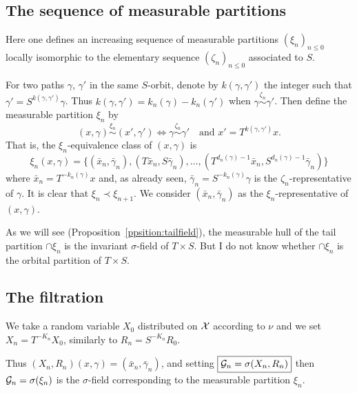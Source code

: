\documentclass[12pt,a4paper]{article}
\begin{document}
\subsection{The sequence of measurable partitions}

Here one defines an increasing sequence of measurable partitions ${(\xi_n)}_{n \leq 0}$ 
locally isomorphic to the elementary sequence ${(\zeta_n)}_{n \leq 0}$ associated to $S$. 

For two paths $\gamma$, $\gamma'$ in the same $S$-orbit, denote by $k(\gamma,\gamma')$ 
the integer such that $\gamma'=S^{k(\gamma,\gamma')}\gamma$. 
Thus $k(\gamma,\gamma') = k_n(\gamma)-k_n(\gamma')$ when $\gamma \overset{\zeta_n}{\sim} \gamma'$. 
Then define the measurable partition $\xi_n$ by 
$$
\boxed{(x, \gamma) \overset{\xi_n}{\sim} (x', \gamma') \iff 
\gamma \overset{\zeta_n}{\sim} \gamma' \quad 
\text{and $x'=T^{k(\gamma,\gamma')}x$}}. 
$$
That is, the $\xi_n$-equivalence class of $(x,\gamma)$ is 
$$
\boxed{\xi_n(x,\gamma) = \bigl\{(\bar x_n, \bar\gamma_n), (T\bar x_n, S\bar\gamma_n), 
\ldots, (T^{d_n(\gamma)-1}\bar x_n, S^{d_n(\gamma)-1}\bar\gamma_n) \bigr\}}
$$
where $\bar x_n = T^{-k_n(\gamma)}x$ and, as already seen, 
$\bar\gamma_n = S^{-k_n(\gamma)}\gamma$ is the $\zeta_n$-representative of 
$\gamma$. 
It is clear that $\xi_n \prec \xi_{n+1}$. 
We  consider $(\bar x_n, \bar\gamma_n)$ as the $\xi_n$-representative of
$(x,\gamma)$. 

\begin{remark}
As we will see (Proposition~\ref{ppsition:tailfield}), 
the measurable hull of the tail partition $\cap \xi_n$ is 
the invariant $\sigma$-field of $T \times S$. 
But I do not know whether $\cap \xi_n$ 
is the orbital partition of $T \times S$.
\end{remark}

\subsection{The filtration} 



We take a random variable $X_0$ distributed on $\mathcal{X}$ according to $\nu$ 
and we set $\boxed{X_n = T^{-K_n} X_0}$, similarly to $R_n = S^{-K_n} R_0$. 

Thus $(X_n,R_n)(x,\gamma) = (\bar x_n, \bar\gamma_n)$, 
and setting $\boxed{\mathcal{G}_n = \sigma(X_n, R_n)}$ then 
$\mathcal{G}_n = \sigma(\xi_n)$ is the $\sigma$-field corresponding to 
the measurable partition $\xi_n$. 
\end{document}
